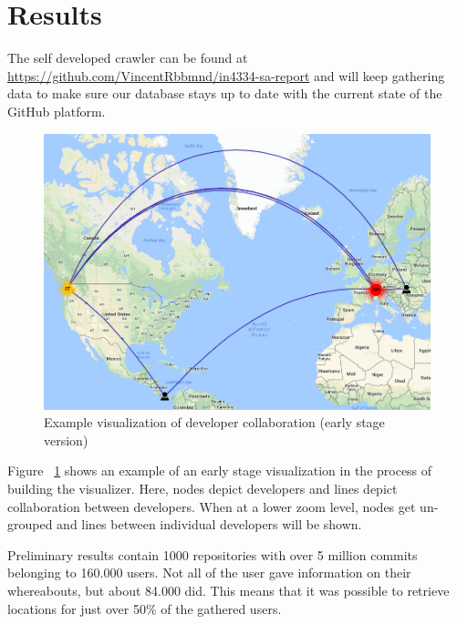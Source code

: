 \documentclass[acmtog, authorversion]{acmart}
\begin{document}
\section{Results}
The self developed crawler can be found at \url{https://github.com/VincentRbbmnd/in4334-sa-report} and will keep gathering data to make sure our database stays up to date with the current state of the GitHub platform.
\begin{figure}
\includegraphics[scale=0.3]{visualizer-example.PNG} 
\caption{Example visualization of developer collaboration (early stage version)}
\label{fig:collaboration}
\end{figure}

Figure ~\ref{fig:collaboration} shows an example of an early stage visualization in the process of building the visualizer.
Here, nodes depict developers and lines depict collaboration between developers.
When at a lower zoom level, nodes get un-grouped and lines between individual developers will be shown.

Preliminary results contain 1000 repositories with over 5 million commits belonging to 160.000 users. 
Not all of the user gave information on their whereabouts, but about 84.000 did.
This means that it was possible to retrieve locations for just over 50\% of the gathered users.



\end{document}
